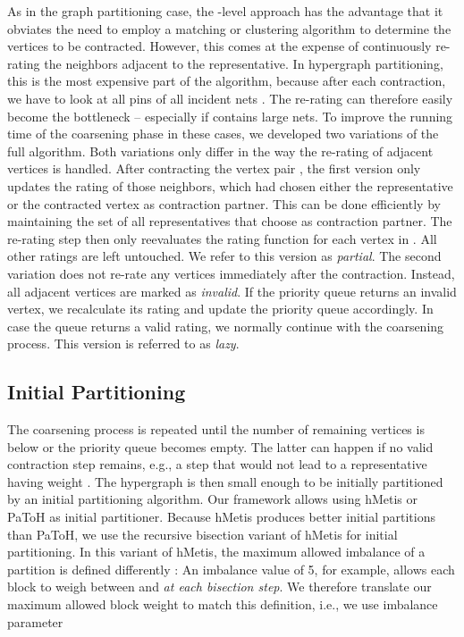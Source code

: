 \documentclass[runningheads,a4paper]{llncs}
\begin{document}
As in the graph partitioning case, the -level approach has the advantage that it obviates the need to employ a matching or clustering
algorithm to determine the vertices to be contracted. However, this comes at the expense of continuously re-rating the neighbors  adjacent to the representative. In hypergraph partitioning, this is the most expensive part of the algorithm, because after each contraction, we have to look at all pins of all incident nets . The re-rating can therefore easily become the bottleneck -- especially if  contains large nets. To improve the running time of the coarsening phase in these cases, we developed two variations of the full algorithm. 
Both variations only differ in the 
way the re-rating of adjacent vertices is handled. After contracting the vertex pair , the first version only updates the rating of those 
neighbors, which had chosen either the representative  or the contracted vertex  as contraction partner. This can be done efficiently by 
maintaining the set  of all representatives that choose  as contraction partner. The re-rating step then only reevaluates the rating function 
for each vertex in . All other ratings are left untouched. We refer to this version as \emph{partial}.
The second variation does not re-rate any vertices immediately after the contraction. Instead, all adjacent vertices  are marked as \emph{invalid}. If the priority queue returns an invalid vertex, we recalculate its rating and update the priority queue accordingly. In case the queue returns a valid rating, we normally continue with the coarsening process.
This version is referred to as \emph{lazy}.

\subsection{Initial Partitioning} \label{InitialPartitioning}
The coarsening process is repeated until the number of remaining vertices is below  or the priority queue becomes empty. The latter can happen if no valid contraction step remains, e.g., a step that would not lead to a representative  having weight . The hypergraph is then small enough to
be initially partitioned by an initial partitioning algorithm. Our framework allows using hMetis or PaToH as initial partitioner.
Because hMetis produces better initial partitions than PaToH, we use the recursive bisection variant of hMetis for initial partitioning.
In this variant of hMetis, the maximum allowed imbalance of a partition is defined differently \cite{hMetisRB}: An imbalance value of 5, for example,
allows each block to weigh between  and  \emph{at each bisection step}. We therefore translate our maximum allowed block 
weight to match this definition, i.e., we use imbalance parameter 
\end{document}
